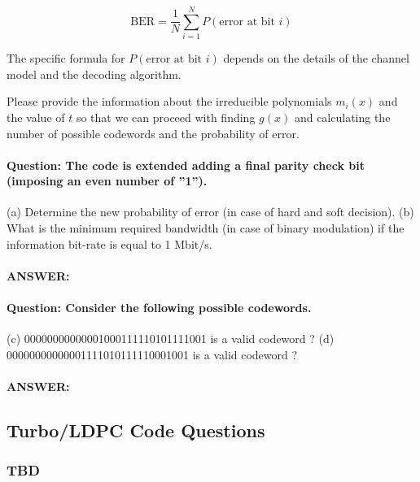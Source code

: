 \documentclass[colorlinks,11pt,a4paper,normalphoto,withhyper,ragged2e]{altareport}
\begin{document}
				\[ \text{{BER}} = \frac{1}{N} \sum_{i=1}^{N} P(\text{{error at bit }} i) \]
				
				The specific formula for \( P(\text{{error at bit }} i) \) depends on the details of the channel model and the decoding algorithm.
				
				Please provide the information about the irreducible polynomials \( m_i(x) \) and the value of \( t \) so that we can proceed with finding \( g(x) \) and calculating the number of possible codewords and the probability of error.
				
				
				
				
				\paragraph{Question: The code is extended adding a final parity check bit (imposing an even number of ”1”).}
				
				(a) Determine the new probability of error (in case of hard and soft decision).
				(b) What is the minimum required bandwidth (in case of binary modulation) if the information bit-rate is equal to 1 Mbit/s.
				
				\paragraph{ANSWER:}
				
				
				
				
				\paragraph{Question: Consider the following possible codewords.}
				
				(c) 00000000000001000111110101111001 is a valid codeword ?
				(d) 00000000000001111010111110001001 is a valid codeword ?
				
				\paragraph{ANSWER:}
				
				
				
	
		\subsection{Turbo/LDPC Code Questions}
			
			\subsubsection{TBD}
				
\end{document}

